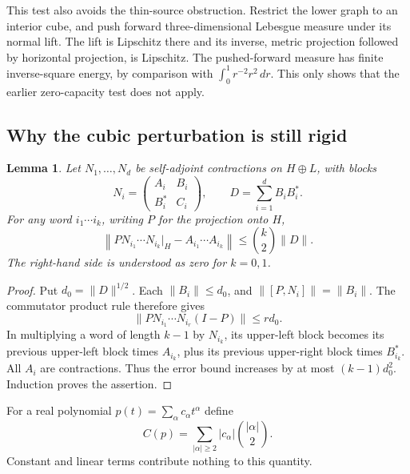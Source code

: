 \documentclass[11pt,letterpaper]{amsart}
\newtheorem{lemma}[theorem]{Lemma}
\theoremstyle{definition}
\theoremstyle{remark}
\numberwithin{equation}{section}
\newcommand{\B}{\mathcal B}
\begin{document}
This test also avoids the thin-source obstruction. Restrict the lower
graph to an interior cube, and push forward three-dimensional Lebesgue
measure under its normal lift. The lift is Lipschitz there and its
inverse, metric projection followed by horizontal projection, is
Lipschitz. The pushed-forward measure has finite inverse-square energy,
by comparison with $\int_0^1r^{-2}r^2\,dr$. This only shows that the
earlier zero-capacity test does not apply.

\subsection{Why the cubic perturbation is still rigid}

\begin{lemma}\label{pert:word}
Let $N_1,\ldots,N_d$ be self-adjoint contractions on $H\oplus L$, with
blocks
\[
 N_i=\begin{pmatrix}A_i&B_i\\B_i^*&C_i\end{pmatrix},
 \qquad D=\sum_{i=1}^d B_iB_i^*.
\]
For any word $i_1\cdots i_k$, writing $P$ for the projection onto $H$,
\[
 \left\|PN_{i_1}\cdots N_{i_k}|_H-A_{i_1}\cdots A_{i_k}\right\|
 \leq \binom{k}{2}\|D\|.
\]
The right-hand side is understood as zero for $k=0,1$.
\end{lemma}
\begin{proof}
Put $d_0=\|D\|^{1/2}$. Each $\|B_i\|\leq d_0$, and
$\|[P,N_i]\|=\|B_i\|$. The commutator product rule therefore gives
\[
 \|PN_{i_1}\cdots N_{i_r}(I-P)\|\leq r d_0.
\]
In multiplying a word of length $k-1$ by $N_{i_k}$, its upper-left
block becomes its previous upper-left block times $A_{i_k}$, plus
its previous upper-right block times $B_{i_k}^*$. All $A_i$ are
contractions. Thus the error bound increases by at most
$(k-1)d_0^2$. Induction proves the assertion.
\end{proof}

For a real polynomial $p(t)=\sum_\alpha c_\alpha t^\alpha$ define
\[
             C(p)=\sum_{|\alpha|\geq2}
                      |c_\alpha|\binom{|\alpha|}{2}.
\]
Constant and linear terms contribute nothing to this quantity.
\end{document}
